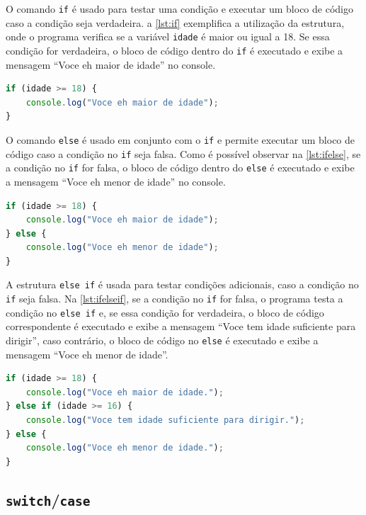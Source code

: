 O comando \texttt{if} é usado para testar uma condição e executar um bloco de código caso a condição seja verdadeira. a \autoref{lst:if} exemplifica a utilização da estrutura, onde o programa verifica se a variável \texttt{idade} é maior ou igual a 18. Se essa condição for verdadeira, o bloco de código dentro do \texttt{if} é executado e exibe a mensagem ``Voce eh maior de idade'' no console.

\begin{lstlisting}[language=TypeScript, caption=Exemplo de condicional \texttt{if} em JS e TS., label=lst:if]
if (idade >= 18) {
    console.log("Voce eh maior de idade");
}
\end{lstlisting}

O comando \texttt{else} é usado em conjunto com o \texttt{if} e permite executar um bloco de código caso a condição no \texttt{if} seja falsa. Como é possível observar na \autoref{lst:ifelse}, se a condição no \texttt{if} for falsa, o bloco de código dentro do \texttt{else} é executado e exibe a mensagem ``Voce eh menor de idade'' no console.


\begin{lstlisting}[language=TypeScript, caption=Exemplo de condicional \texttt{if/else} em JS e TS., label=lst:ifelse]
if (idade >= 18) {
    console.log("Voce eh maior de idade");
} else {
    console.log("Voce eh menor de idade");
}
\end{lstlisting}

A estrutura \texttt{else if} é usada para testar condições adicionais, caso a condição no \texttt{if} seja falsa. Na \autoref{lst:ifelseif}, se a condição no \texttt{if} for falsa, o programa testa a condição no \texttt{else if} e, se essa condição for verdadeira, o bloco de código correspondente é executado e exibe a mensagem ``Voce tem idade suficiente para dirigir'', caso contrário, o bloco de código no \texttt{else} é executado e exibe a mensagem ``Voce eh menor de idade''.

\begin{lstlisting}[language=TypeScript, caption=Exemplo de condicional utlizando \texttt{if/else} e \texttt{else if} em JS e TS., label=lst:ifelseif]
if (idade >= 18) {
    console.log("Voce eh maior de idade.");
} else if (idade >= 16) {
    console.log("Voce tem idade suficiente para dirigir.");
} else {
    console.log("Voce eh menor de idade.");
}
\end{lstlisting}

\subsection{\texttt{switch}/\texttt{case}}

